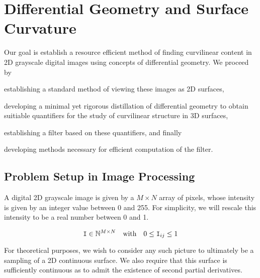 \chapter{Differential Geometry and Surface Curvature} \label{ch:diffgeo}


Our goal is establish a resource efficient method of finding curvilinear content in 2D grayscale digital images using concepts of differential geometry. We proceed by
\begin{enumerate*}[label=(\roman*)]
	\item establishing a standard method of viewing these images as 2D surfaces,
	\item developing a minimal yet rigorous distillation of differential geometry
			to obtain suitiable quantifiers
			for the study of curvilinear structure in 3D surfaces,
	\item establishing a filter based on these quantifiers,
	and finally
	\item developing methods necessary for efficient computation of the filter.
\end{enumerate*}


\section{Problem Setup in Image Processing}\label{sec:image-processing-setup}

A digital 2D grayscale image is given by a $M\times N$ array of pixels, whose intensity is given by an integer value between 0 and 255. For simplicity, we will rescale this intensity to be a real number between 0 and 1.

\begin{defn} \label{def:image_as_pixel_matrix}
	\begin{equation*}
	\mathtt{I} \in \mathbb{N}^{M \times N}
	\quad\textrm{with}\quad
	0 \le \mathtt{I}_{ij} \le 1
	\end{equation*}
\end{defn}
	For theoretical purposes, we wish to consider any such picture to ultimately be a sampling of a 2D continuous surface. We also require that this surface is sufficiently continuous as to admit the existence of second partial derivatives.
	
